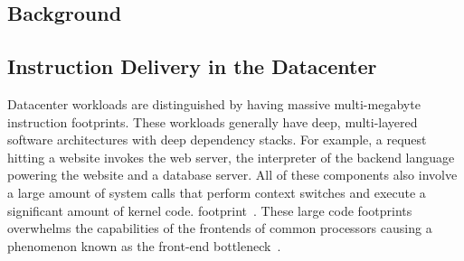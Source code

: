 \documentclass[../main.tex]{subfiles}
\begin{document}
\ifx\chapincluded\undefined
  \begin{refsection}
 \fi

\chapter{Background}
\label{chap:background}



\section{Instruction Delivery in the Datacenter}
\label{sec:instr-delivery}

\label{sec:btb-background}


Datacenter workloads are distinguished by having massive multi-megabyte instruction footprints. These workloads generally have deep, multi-layered software architectures with deep dependency stacks. For example, a request hitting a website invokes the web server, the interpreter of the backend language powering the website and a database server. All of these components also involve a large amount of system calls that perform context switches and execute a significant amount of kernel code. footprint~\cite{ferdman12_clear_cloud,ailamaki99_dbmss_moder_proces}. These large code footprints overwhelms the capabilities of the frontends of common processors causing a phenomenon known as the front-end bottleneck~\cite{kanev15_profil,ferdman12_clear_cloud,ayers19_asmdb,kanev15_profil,kumar17_boomer,kumar18_blast_throug_front_end_bottl_with_shotg,kumar20_shoot_down_server_front_end_bottl,spracklen05_effec_instr_prefet_chip_multip}.




\end{refsection}
\end{document}
